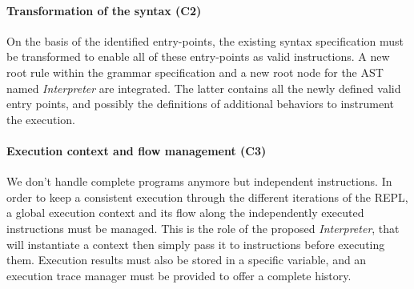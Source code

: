 \paragraph{Transformation of the syntax (C2)}

On the basis of the identified entry-points, the existing syntax specification must be transformed to enable all of these entry-points as valid instructions. A new root rule within the grammar specification and a new root node for the AST named \emph{Interpreter} are integrated. The latter contains all the newly defined valid entry points, and possibly the definitions of additional behaviors to instrument the execution. 

\paragraph{Execution context and flow management (C3)}

We don't handle complete programs anymore but independent instructions.
In order to keep a consistent execution through the different iterations of the REPL, a global execution context and its flow along the independently executed instructions must be managed. This is the role of the proposed \textit{Interpreter}, that will instantiate a context then simply pass it to instructions before executing them. Execution results must also be stored in a specific variable, and an execution trace manager must be provided to offer a complete history. 

